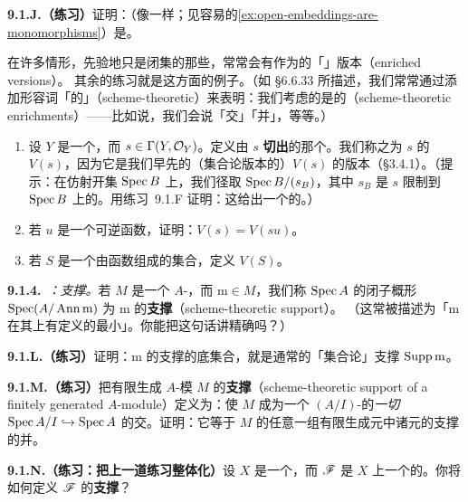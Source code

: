 \textbf{9.1.J.（练习）}\quad 证明：\trClosedEmbedding{}（像\trOpenEmbedding{}一样；见容易的\cref{ex:open-embeddings-are-monomorphisms}）是\trMonomorphism。

在许多情形，先验地只是闭集的那些\trLocus，常常会有作为\trClosedSubscheme{}的「\trEnrichment{}」版本（enriched versions）。%
其余的练习就是这方面的例子。（如 \S6.6.33 所描述，我们常常通过添加形容词「\trSchemeTheoretic{}的」（scheme-theoretic）来表明：我们考虑的是\trSchemeTheoretic{}的\trEnrichment{}（scheme-theoretic enrichments）——比如说，我们会说「\trSchemeTheoretic{}交」「\trSchemeTheoretic{}并」，等等。）

\begin{exercise}\label{ex:vanishing-scheme-global-section}
\begin{enumerate}[label=(\alph*)]
\item 设 $Y$ 是一个\trScheme，而 $s\in\Gamma(Y,\mathcal{O}_Y)$。定义由 $s$ \textbf{切出}的那个\trClosedSubscheme。我们称之为 $s$ 的\textbf{\trVanishingScheme} $V(s)$，因为它是我们早先的（集合论版本的）$V(s)$ 的\trSchemeTheoretic{}版本（\S3.4.1）。（提示：在仿射开集 $\operatorname{Spec} B$ 上，我们径取 $\operatorname{Spec} B/(s_B)$，其中 $s_B$ 是 $s$ 限制到 $\operatorname{Spec} B$ 上的\trSection。用\mbox{练习~9.1.F} 证明：这给出一个\trWellDefined{}的\trClosedSubscheme。）
\item 若 $u$ 是一个可逆函数，证明：$V(s)=V(su)$。
\item 若 $S$ 是一个由函数组成的集合，定义 $V(S)$。
\end{enumerate}
\end{exercise}

\textbf{9.1.4.}\ \emph{\trhDefinition{}：\trSchemeTheoretic{}支撑。}\quad 若 $M$ 是一个 $A$-\trModule，而 $\mathrm{m}\in M$，我们称 $\operatorname{Spec} A$ 的闭子概形 $\operatorname{Spec}(A/\operatorname{Ann}\mathrm{m})$ 为 $\mathrm{m}$ 的\textbf{\trSchemeTheoretic{}支撑}（scheme-theoretic support）。%
（这常被描述为「$\mathrm{m}$ 在其上有定义的最小\trClosedSubscheme」。你能把这句话讲精确吗？）

\textbf{9.1.L.（练习）}\quad 证明：$\mathrm{m}$ 的\trSchemeTheoretic{}支撑的底集合，就是通常的「集合论」支撑 $\operatorname{Supp}\mathrm{m}$。

\textbf{9.1.M.（练习）}\quad 把有限生成 $A$-模 $M$ 的\textbf{\trSchemeTheoretic{}支撑}（scheme-theoretic support of a finitely generated $A$-module）定义为：使 $M$ 成为一个 $(A/I)$-\trModule{}的\emph{一切}\trClosedSubscheme{} $\operatorname{Spec} A/I\hookrightarrow\operatorname{Spec} A$ 的\trSchemeTheoretic{}交。证明：它等于 $M$ 的任意一组有限生成元中诸元的\trSchemeTheoretic{}支撑的\trSchemeTheoretic{}并。

\textbf{9.1.N.（练习：把上一道练习整体化）}\quad 设 $X$ 是一个\trScheme，而 $\mathscr{F}$ 是 $X$ 上一个\trFiniteType{}的\trQCSheaf。你将如何定义 $\mathscr{F}$ 的\textbf{\trSchemeTheoretic{}支撑}？
